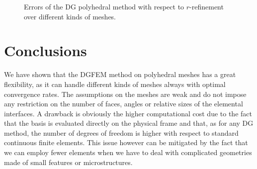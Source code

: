 \documentclass[12pt, a4paper]{article}
\theoremstyle{definition}
\theoremstyle{plain}
\theoremstyle{plain}
\theoremstyle{definition}
\begin{document}
\begin{figure}[h]
	\caption{Errors of the DG polyhedral method with respect to $r$-refinement 
	over different kinds of meshes.} \label{fig:rconv}
\end{figure}
\clearpage
\section{Conclusions}\label{sec:conc}
We have shown that the DGFEM method on polyhedral meshes has a great 
flexibility, as it can handle different kinds of meshes always with 
optimal convergence rates. The assumptions on the meshes are weak and do not 
impose any restriction on the number of faces, angles or relative sizes of the 
elemental interfaces. A drawback is obviously the higher computational cost due 
to the fact that the basis is evaluated directly on the 
physical frame and that, as for any DG method, the number of degrees of 
freedom is higher with respect to standard continuous finite elements. This 
issue however can be mitigated by the fact that we can employ fewer elements 
when we have to deal with complicated geometries made of small features or 
microstructures.
\end{document}
